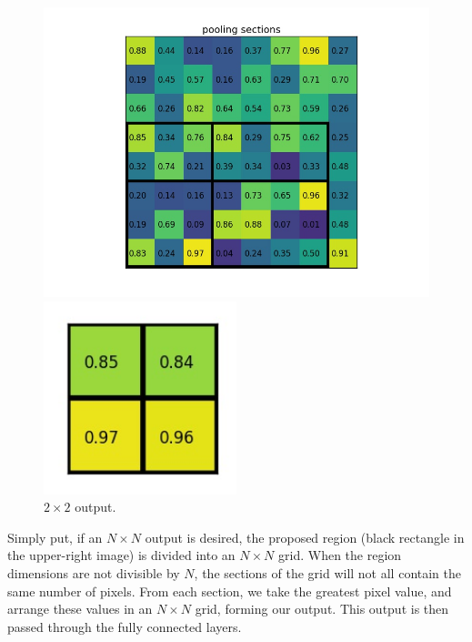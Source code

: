 \documentclass{article}
\begin{document}
\begin{figure}[htbp]
    \centering
    \begin{minipage}{0.5\textwidth}
        \centering
        \includegraphics[width=1.1\textwidth]{roipool3.jpg} %
    \end{minipage}\hfill
    \begin{minipage}{0.5\textwidth}
        \centering
        \includegraphics[width=0.5\textwidth]{roipool4.jpg} %
        \caption{$2\times2$ output.}
    \end{minipage}
\end{figure}

Simply put, if an $N\times N$ output is desired, the proposed region (black rectangle in the upper-right image) is divided into an $N\times N$ grid. When the region dimensions are not divisible by $N$, the sections of the grid will not all contain the same number of pixels. From each section, we take the greatest pixel value, and arrange these values in an $N\times N$ grid, forming our output. This output is then passed through the fully connected layers.
\end{document}
